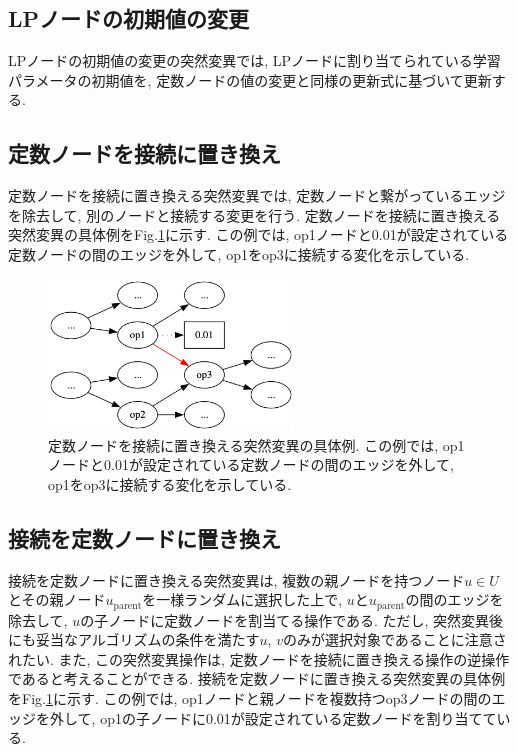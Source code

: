 \documentclass[11pt,oneside,openany,report]{jsbook}
\begin{document}
\subsection{LPノードの初期値の変更}
LPノードの初期値の変更の突然変異では, LPノードに割り当てられている学習パラメータの初期値を, 定数ノードの値の変更と同様の更新式に基づいて更新する.

\subsection{定数ノードを接続に置き換え}
定数ノードを接続に置き換える突然変異では, 定数ノードと繋がっているエッジを除去して, 別のノードと接続する変更を行う. 定数ノードを接続に置き換える突然変異の具体例をFig.\ref{fig:mgg_automl_zero_vag:mutation:const_to_connection}に示す. この例では, op1ノードと0.01が設定されている定数ノードの間のエッジを外して, op1をop3に接続する変化を示している.

\begin{figure}
  \centering
  \includegraphics[width=6.5cm]{mgg_automl_zero_vag/mutations/const_to_connection.png}
  \caption{定数ノードを接続に置き換える突然変異の具体例. この例では, op1ノードと0.01が設定されている定数ノードの間のエッジを外して, op1をop3に接続する変化を示している.}
  \label{fig:mgg_automl_zero_vag:mutation:const_to_connection}
\end{figure}

\subsection{接続を定数ノードに置き換え}
接続を定数ノードに置き換える突然変異は, 複数の親ノードを持つノード$u \in U$とその親ノード$u_\mathrm{parent}$を一様ランダムに選択した上で, $u$と$u_\mathrm{parent}$の間のエッジを除去して, $u$の子ノードに定数ノードを割当てる操作である. ただし, 突然変異後にも妥当なアルゴリズムの条件を満たす$u$, $v$のみが選択対象であることに注意されたい. また, この突然変異操作は, 定数ノードを接続に置き換える操作の逆操作であると考えることができる. 接続を定数ノードに置き換える突然変異の具体例をFig.\ref{fig:mgg_automl_zero_vag:mutation:const_to_connection}に示す. この例では, op1ノードと親ノードを複数持つop3ノードの間のエッジを外して, op1の子ノードに0.01が設定されている定数ノードを割り当てている.
\end{document}
